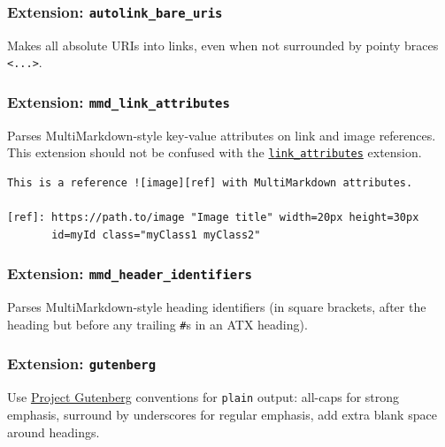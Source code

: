 \documentclass[
]{article}
\begin{document}
\hypertarget{extension-autolink_bare_uris}{%
\subsubsection{\texorpdfstring{Extension:
\texttt{autolink\_bare\_uris}}{Extension: autolink\_bare\_uris}}\label{extension-autolink_bare_uris}}

Makes all absolute URIs into links, even when not surrounded by pointy
braces \texttt{\textless{}...\textgreater{}}.

\hypertarget{extension-mmd_link_attributes}{%
\subsubsection{\texorpdfstring{Extension:
\texttt{mmd\_link\_attributes}}{Extension: mmd\_link\_attributes}}\label{extension-mmd_link_attributes}}

Parses MultiMarkdown-style key-value attributes on link and image
references. This extension should not be confused with the
\protect\hyperlink{extension-link_attributes}{\texttt{link\_attributes}}
extension.

\begin{verbatim}
This is a reference ![image][ref] with MultiMarkdown attributes.

[ref]: https://path.to/image "Image title" width=20px height=30px
       id=myId class="myClass1 myClass2"
\end{verbatim}

\hypertarget{extension-mmd_header_identifiers}{%
\subsubsection{\texorpdfstring{Extension:
\texttt{mmd\_header\_identifiers}}{Extension: mmd\_header\_identifiers}}\label{extension-mmd_header_identifiers}}

Parses MultiMarkdown-style heading identifiers (in square brackets,
after the heading but before any trailing \texttt{\#}s in an ATX
heading).

\hypertarget{extension-gutenberg}{%
\subsubsection{\texorpdfstring{Extension:
\texttt{gutenberg}}{Extension: gutenberg}}\label{extension-gutenberg}}

Use \href{https://www.gutenberg.org}{Project Gutenberg} conventions for
\texttt{plain} output: all-caps for strong emphasis, surround by
underscores for regular emphasis, add extra blank space around headings.
\end{document}
